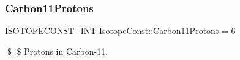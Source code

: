 \subsubsection{\texorpdfstring{Carbon11\+Protons}{Carbon11Protons}}
{\footnotesize\ttfamily \mbox{\hyperlink{group___isotope_const-_macros_ga5f18360b3e99483a35c32d789e62621c}{I\+S\+O\+T\+O\+P\+E\+C\+O\+N\+S\+T\+\_\+\+I\+NT}} Isotope\+Const\+::\+Carbon11\+Protons = 6}

\$ \$ Protons in Carbon-\/11. 